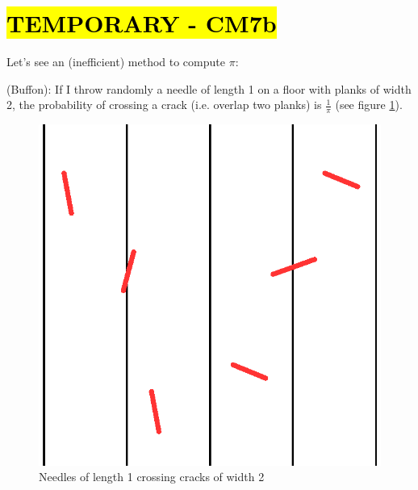 \part*{\hl{TEMPORARY - CM7b}}

Let's see an (inefficient) method to compute $\pi$:

\begin{theorem} (Buffon): If I throw randomly a needle of length 1 on a floor with planks of width 2, the probability of crossing a crack (i.e. overlap two planks) is $\frac{1}{\pi}$ (see figure \ref{needles}).
\end{theorem}


\begin{figure}[h]
\centering
\includegraphics[scale=0.7]{images/needles.eps}
\caption{Needles of length 1 crossing cracks of width 2}
\label{needles}
\end{figure}


